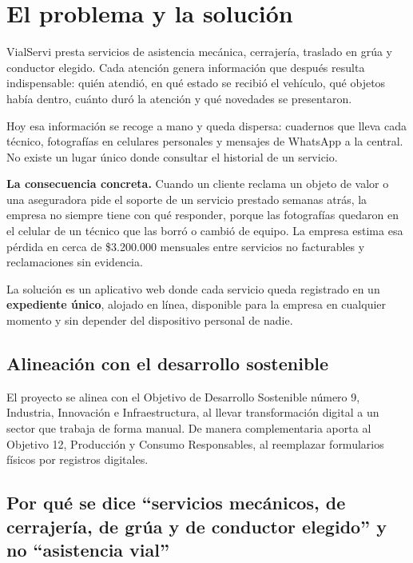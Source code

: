 \section{El problema y la solución}

VialServi presta servicios de asistencia mecánica, cerrajería, traslado en grúa y
conductor elegido. Cada atención genera información que después resulta
indispensable: quién atendió, en qué estado se recibió el vehículo, qué objetos
había dentro, cuánto duró la atención y qué novedades se presentaron.

Hoy esa información se recoge a mano y queda dispersa: cuadernos que lleva cada
técnico, fotografías en celulares personales y mensajes de WhatsApp a la central.
No existe un lugar único donde consultar el historial de un servicio.

\begin{clave}
\textbf{La consecuencia concreta.} Cuando un cliente reclama un objeto de valor o
una aseguradora pide el soporte de un servicio prestado semanas atrás, la empresa
no siempre tiene con qué responder, porque las fotografías quedaron en el celular
de un técnico que las borró o cambió de equipo. La empresa estima esa pérdida en
cerca de \$3.200.000 mensuales entre servicios no facturables y reclamaciones sin
evidencia.
\end{clave}

La solución es un aplicativo web donde cada servicio queda registrado en un
\textbf{expediente único}, alojado en línea, disponible para la empresa en
cualquier momento y sin depender del dispositivo personal de nadie.

\subsection{Alineación con el desarrollo sostenible}

El proyecto se alinea con el Objetivo de Desarrollo Sostenible número 9, Industria,
Innovación e Infraestructura, al llevar transformación digital a un sector que
trabaja de forma manual. De manera complementaria aporta al Objetivo 12,
Producción y Consumo Responsables, al reemplazar formularios físicos por registros
digitales.

\subsection{Por qué se dice ``servicios mecánicos, de cerrajería, de grúa y de
conductor elegido'' y no ``asistencia vial''}

